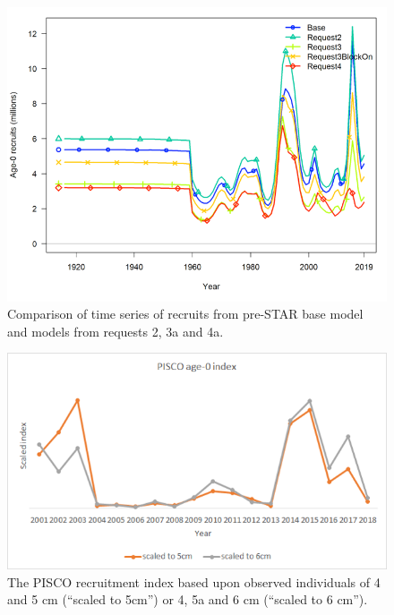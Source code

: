 \documentclass[12pt,]{article}
\begin{document}
\begin{figure}
\centering
\includegraphics{Figures/STAR_request4.png}
\caption{Comparison of time series of recruits from pre-STAR base model
and models from requests 2, 3a and 4a. \label{fig:STAR_request4}}
\end{figure}

\FloatBarrier

\begin{figure}
\centering
\includegraphics{Figures/STAR_request8.png}
\caption{The PISCO recruitment index based upon observed individuals of
4 and 5 cm (``scaled to 5cm'') or 4, 5a and 6 cm (``scaled to 6 cm'').
\label{fig:STAR_request8}}
\end{figure}

\FloatBarrier
\end{document}
